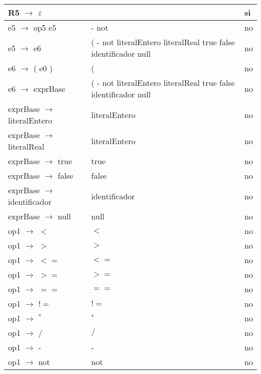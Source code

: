 \documentclass[11pt]{article}
\begin{document}
\begin{longtable}{|p{6cm}|p{4cm}|p{3cm}|}
                \hline
                R5 $\rightarrow$ $\varepsilon$ &  & si \\
                \hline
                e5 $\rightarrow$ op5 e5 & - not & no \\
                \hline
                e5 $\rightarrow$ e6 & ( - not literalEntero literalReal true false identificador null & no \\
                \hline
                e6 $\rightarrow$ ( e0 ) & ( & no \\
                \hline
                e6 $\rightarrow$ exprBase & ( - not literalEntero literalReal true false identificador null & no \\
                \hline
                exprBase $\rightarrow$ literalEntero & literalEntero & no \\
                \hline
                exprBase $\rightarrow$ literalReal & literalEntero & no \\
                \hline
                exprBase $\rightarrow$ true & true & no \\
                \hline
                exprBase $\rightarrow$ false & false & no \\
                \hline
                exprBase $\rightarrow$ identificador & identificador & no \\
                \hline
                exprBase $\rightarrow$ null & null & no \\
                \hline
                op1 $\rightarrow$ $<$ & $<$ & no \\
                \hline
                op1 $\rightarrow$ $>$ & $>$ & no \\
                \hline
                op1 $\rightarrow$ $<=$ & $<=$ & no \\
                \hline
                op1 $\rightarrow$ $>=$ & $>=$ & no \\
                \hline
                op1 $\rightarrow$ $==$ & $==$ & no \\
                \hline
                op1 $\rightarrow$ $!=$ & $!=$ & no \\
                \hline
                op1 $\rightarrow$ $^{\ast}$ & $^{\ast}$ & no \\
                \hline
                op1 $\rightarrow$ $/$ & $/$ & no \\
                \hline
                op1 $\rightarrow$ - & - & no \\
                \hline
                op1 $\rightarrow$ not & not & no \\
                \hline
            \end{longtable}
\end{document}
